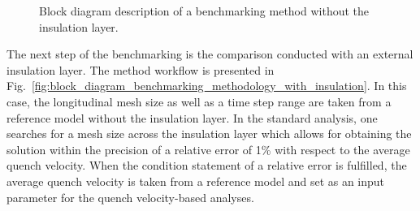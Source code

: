 \begin{figure}[H]
    \caption{Block diagram description of a benchmarking method without the insulation layer.}
    \label{fig:block_diagram_benchmarking_methodology_no_insulation}
\end{figure}

The next step of the benchmarking is the comparison conducted with an external insulation layer. The method workflow is presented in Fig.~\ref{fig:block_diagram_benchmarking_methodology_with_insulation}. In this case, the longitudinal mesh size as well as a time step range are taken from a reference model without the insulation layer. In the standard analysis, one searches for a mesh size across the insulation layer which allows for obtaining the solution within the precision of a relative error of 1\% with respect to the average quench velocity. When the condition statement of a relative error is fulfilled, the average quench velocity is taken from a reference model and set as an input parameter for the quench velocity-based analyses. 

